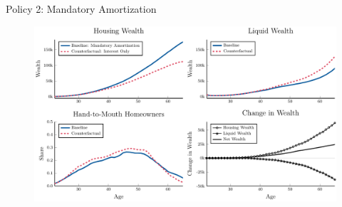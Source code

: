 \documentclass[10pt,english,t,10pt]{beamer}
\begin{document}
%
%

\begin{frame}{Policy 2: Mandatory Amortization}
\begin{figure}[ht]
\centering
\includegraphics[scale=0.5]{Prezentation_Graphs/MandatoryAmortization}
\end{figure}
\end{frame}
\end{document}
